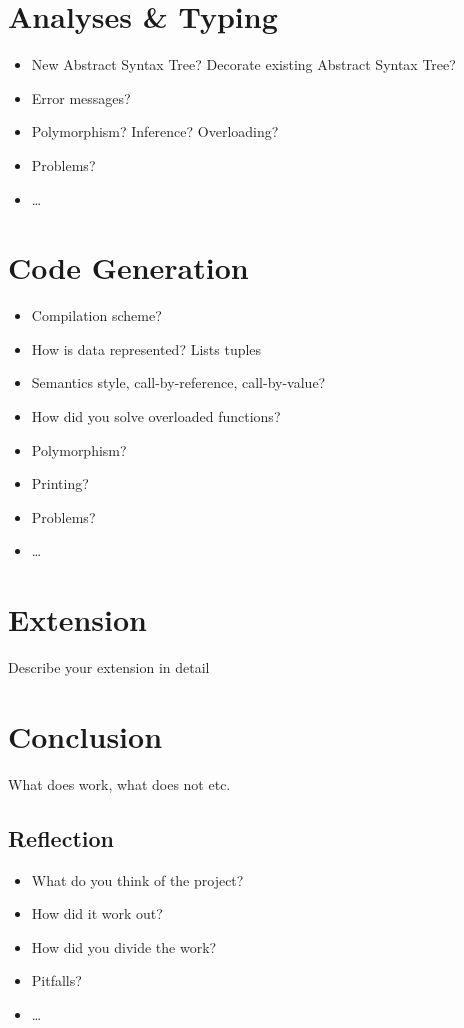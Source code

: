\documentclass{report}
\begin{document}
\chapter{Analyses \& Typing}
\begin{itemize}
	\item New Abstract Syntax Tree? Decorate existing Abstract Syntax Tree?
	\item Error messages?
	\item Polymorphism? Inference? Overloading?
	\item Problems?
	\item\ldots
\end{itemize}

\chapter{Code Generation}
\begin{itemize}
	\item Compilation scheme?
	\item How is data represented? Lists tuples
	\item Semantics style, call-by-reference, call-by-value?
	\item How did you solve overloaded functions?
	\item Polymorphism?
	\item Printing?
	\item Problems?
	\item\ldots
\end{itemize}

\chapter{Extension}
Describe your extension in detail

\chapter{Conclusion}
What does work, what does not etc.

\section{Reflection}
\begin{itemize}
	\item What do you think of the project?
	\item How did it work out?
	\item How did you divide the work?
	\item Pitfalls?
	\item \ldots
\end{itemize}
\end{document}
